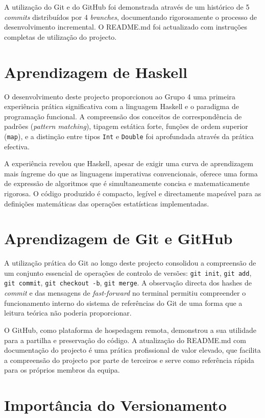 \documentclass[12pt, a4paper, oneside]{report}
\begin{document}
A utilização do Git e do GitHub foi demonstrada através de um histórico de 5 \textit{commits} distribuídos por 4 \textit{branches}, documentando rigorosamente o processo de desenvolvimento incremental. O README.md foi actualizado com instruções completas de utilização do projecto.

\section{Aprendizagem de Haskell}

O desenvolvimento deste projecto proporcionou ao Grupo 4 uma primeira experiência prática significativa com a linguagem Haskell e o paradigma de programação funcional. A compreensão dos conceitos de correspondência de padrões (\textit{pattern matching}), tipagem estática forte, funções de ordem superior (\texttt{map}), e a distinção entre tipos \texttt{Int} e \texttt{Double} foi aprofundada através da prática efectiva.

A experiência revelou que Haskell, apesar de exigir uma curva de aprendizagem mais íngreme do que as linguagens imperativas convencionais, oferece uma forma de expressão de algoritmos que é simultaneamente concisa e matematicamente rigorosa. O código produzido é compacto, legível e directamente mapeável para as definições matemáticas das operações estatísticas implementadas.

\section{Aprendizagem de Git e GitHub}

A utilização prática do Git ao longo deste projecto consolidou a compreensão de um conjunto essencial de operações de controlo de versões: \texttt{git init}, \texttt{git add}, \texttt{git commit}, \texttt{git checkout -b}, \texttt{git merge}. A observação directa dos hashes de \textit{commit} e das mensagens de \textit{fast-forward} no terminal permitiu compreender o funcionamento interno do sistema de referências do Git de uma forma que a leitura teórica não poderia proporcionar.

O GitHub, como plataforma de hospedagem remota, demonstrou a sua utilidade para a partilha e preservação do código. A atualização do README.md com documentação do projecto é uma prática profissional de valor elevado, que facilita a compreensão do projecto por parte de terceiros e serve como referência rápida para os próprios membros da equipa.

\section{Importância do Versionamento}
\end{document}
